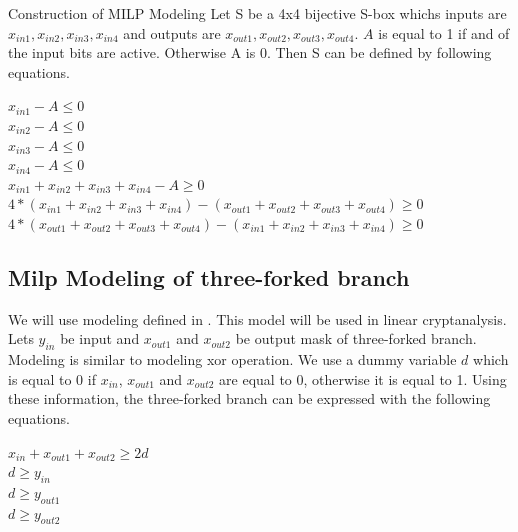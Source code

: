 \documentclass [version=final]{iacrcc}
\begin{document}
\begin{section}{Construction of MILP Modeling}
Let S be a 4x4 bijective S-box whichs inputs are $x_{in1},x_{in2},x_{in3},x_{in4}$ and outputs are $x_{out1},x_{out2},x_{out3},x_{out4}$. $A$ is equal to 1 if and of the input bits are active. Otherwise A is 0. Then S can be defined by following equations.

\begin{center}
    $x_{in1} - A \leq 0$ \\
    $x_{in2} - A \leq 0$ \\
    $x_{in3} - A \leq 0$ \\
    $x_{in4} - A \leq 0$ \\
    $x_{in1} + x_{in2} + x_{in3} + x_{in4} - A \geq 0$ \\
    $4*(x_{in1} + x_{in2} + x_{in3} + x_{in4}) - (x_{out1} + x_{out2} + x_{out3} + x_{out4}) \geq 0$ \\
    $4*(x_{out1} + x_{out2} + x_{out3} + x_{out4}) - (x_{in1} + x_{in2} + x_{in3} + x_{in4}) \geq 0$ \\
\end{center}

\subsection{Milp Modeling of three-forked branch }

We will use modeling defined in \cite{mouha2012differential}. This model will be used in linear cryptanalysis. Lets $y_{in}$ be input and $x_{out1}$ and $x_{out2}$ be output mask of three-forked branch. Modeling is similar to modeling xor operation. We use a dummy variable $d$ which is equal to 0 if $x_{in}$, $x_{out1}$ and $x_{out2}$ are equal to 0, otherwise it is equal to 1. Using these information, the three-forked branch can be expressed with the following equations.

\begin{center}
    $x_{in} + x_{out1} + x_{out2} \geq 2d $ \\
    $d \geq y_{in} $ \\
    $d \geq y_{out1} $ \\
    $d \geq y_{out2} $ 
\end{center}

\end{section}
\end{document}
